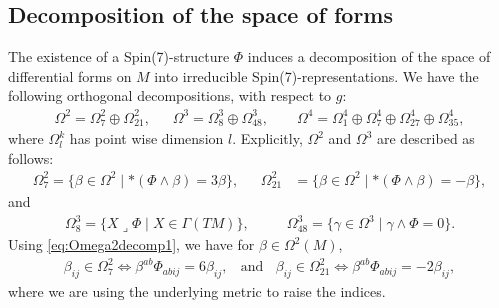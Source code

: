 \documentclass[10pt,a4paper,reqno]{article}
\theoremstyle{definition}
\newtheorem{remark}[theorem]{Remark}
\numberwithin{equation}{section}
\def\s7{\Phi}
\begin{document}
\subsection{Decomposition of the space of forms}\label{subsec:formdecomp}

The existence of a Spin(7)-structure $\s7$ induces a decomposition of the space of differential forms on $M$  into irreducible Spin(7)-representations. We have the following orthogonal decompositions, with respect to $g$:
\begin{align*}
\Omega^2=\Omega^2_{7}\oplus \Omega^2_{21},\ \ \ \ \ \ \ \Omega^3=\Omega^3_{8}\oplus \Omega^3_{48}, \ \ \ \ \ \ \ \ \  \Omega^4=\Omega^4_{1}\oplus \Omega^4_{7}\oplus \Omega^4_{27}\oplus \Omega^4_{35},
\end{align*}
where $\Omega^k_l$ has point wise dimension $l$. Explicitly, $\Omega^2$ and $\Omega^3$ are described as follows:
\begin{align}\label{eq:Omega2decomp1}
\Omega^2_7=\{\beta \in \Omega^2 \mid *(\s7 \wedge \beta)=3\beta\}, \ \ \ \ \ \ \ \Omega^2_{21}&=\{ \beta\in \Omega^2 \mid *(\s7\wedge \beta)=-\beta\}, 
\end{align}
and
\begin{align}\label{eq:Omega3decomp1}
\Omega^3_8=\{ X\lrcorner \s7 \mid X\in \Gamma(TM)\},\ \ \ \ \ \ \ \ \ \ \ \ \Omega^3_{48}=\{ \gamma \in \Omega^3\mid \gamma \wedge \s7 =0\}. 
\end{align}
Using \cref{eq:Omega2decomp1}, we have for $\beta\in \Omega^2(M)$,
\begin{align}\label{eq:Omega2decomp2}
\beta_{ij}\in \Omega^2_7 \iff \beta^{ab}\s7_{abij}=6\beta_{ij},\ \ \ \ \text{and}\ \ \ \ 
\beta_{ij}\in \Omega^2_{21} \iff \beta^{ab}\s7_{abij}=-2\beta_{ij},
\end{align}
where we are using the underlying metric to raise the indices.

\end{document}
